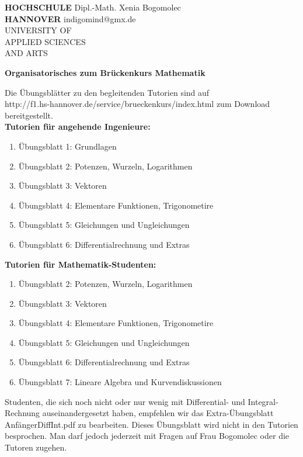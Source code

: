 \documentclass[12pt]{article}
\begin{document}
\pagestyle{empty}
\parindent 0cm
\begin{minipage}{14cm}
  \footnotesize{
  \textbf{HOCHSCHULE} \hfill Dipl.-Math. Xenia Bogomolec\\
  \textbf{HANNOVER}   \hfill indigomind@gmx.de  \\
  UNIVERSITY OF\\
  APPLIED SCIENCES\\
  AND ARTS
  }
\end{minipage}
\vspace{0.5cm}

{\large \bf Organisatorisches zum Br\"uckenkurs Mathematik}

\vspace{0.5cm}
\normalsize
\parindent0cm


Die \"Ubungsbl\"atter zu den begleitenden Tutorien sind auf \\
http://f1.hs-hannover.de/service/brueckenkurs/index.html zum Download be\-reit\-gestellt. \\

{\bf Tutorien f\"ur angehende Ingenieure:} 

\begin{enumerate}
  \item[] \"Ubungsblatt 1: Grundlagen
  \item[] \"Ubungsblatt 2: Potenzen, Wurzeln, Logarithmen
  \item[] \"Ubungsblatt 3: Vektoren
  \item[] \"Ubungsblatt 4: Elementare Funktionen, Trigonometire
  \item[] \"Ubungsblatt 5: Gleichungen und Ungleichungen
  \item[] \"Ubungsblatt 6: Differentialrechnung und Extras
\end{enumerate}

{\bf Tutorien f\"ur Mathematik-Studenten:} 

\begin{enumerate}
  \item[] \"Ubungsblatt 2: Potenzen, Wurzeln, Logarithmen
  \item[] \"Ubungsblatt 3: Vektoren
  \item[] \"Ubungsblatt 4: Elementare Funktionen, Trigonometire
  \item[] \"Ubungsblatt 5: Gleichungen und Ungleichungen
  \item[] \"Ubungsblatt 6: Differentialrechnung und Extras
  \item[] \"Ubungsblatt 7: Lineare Algebra und Kurvendiskussionen
\end{enumerate}

\vspace{0.5cm}

Studenten, die sich noch nicht oder nur wenig mit Differential- und Integral-Rechnung auseinandergesetzt haben, empfehlen wir das Extra-\"Ubungsblatt Anf\"angerDiffInt.pdf zu bearbeiten. Dieses \"Ubungsblatt wird nicht in den Tutorien besprochen. Man darf jedoch jederzeit mit Fragen auf Frau Bogomolec oder die Tutoren zugehen. \\
\end{document}
